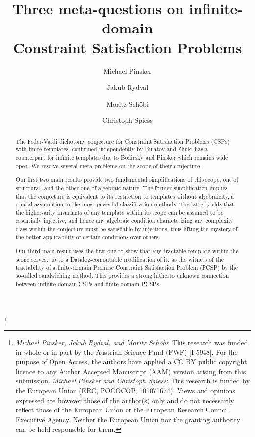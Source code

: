 \documentclass[oneside,reqno,10pt]{amsart}
\theoremstyle{plain}
\theoremstyle{remark}
\begin{document}
\title[Three meta-questions on infinite-domain Constraint Satisfaction Problems]{Three meta-questions on infinite-domain \\ Constraint Satisfaction Problems}
 
 
 
\author{Michael Pinsker}
\author{Jakub Rydval}
\author{Moritz Sch\"{o}bi}
\author{Christoph Spiess}


\address{Institut f\"{u}r Diskrete Mathematik und Geometrie, FG Algebra, TU Wien, Austria}

 



 
 

 \begin{abstract}   
 The Feder-Vardi dichotomy conjecture for Constraint Satisfaction Problems (CSPs) with finite templates, confirmed independently by Bulatov and Zhuk, has a counterpart for infinite templates due to Bodirsky and Pinsker which remains wide open. We resolve several meta-problems on the scope of their conjecture.

Our first two main results provide 
%
two fundamental simplifications of this scope, 
one of  structural, and the other one of algebraic nature. The former simplification implies that the conjecture is equivalent to its restriction to templates without algebraicity, a crucial assumption in the most powerful classification methods. The latter yields that the higher-arity invariants of any template within its scope can be assumed to be essentially injective, and hence any algebraic condition characterizing any complexity class within the conjecture must be satisfiable by injections, thus lifting the mystery of the better applicability of certain conditions over others.

Our third main result uses the first one to show that any tractable template within the scope  serves, up to a Datalog-computable modification of it, as the witness of the tractability of a finite-domain Promise Constraint Satisfaction Problem (PCSP) by the so-called sandwiching method. This provides a strong hitherto unknown connection between infinite-domain CSPs and finite-domain PCSPs.
\end{abstract}  

\thanks{\emph{Michael Pinsker, Jakub Rydval, and Moritz Sch\"{o}bi}: This research was funded in whole or in part by the Austrian Science Fund (FWF) [I 5948]. For the purpose of Open Access, the authors have applied a CC BY public copyright licence to any Author Accepted Manuscript (AAM) version arising from this submission. \emph{Michael Pinsker and Christoph Spiess}: This research is  funded by the European Union (ERC, POCOCOP, 101071674). Views and opinions expressed are however those of the author(s) only and do not necessarily reflect those of the European Union or the European Research Council Executive Agency. Neither the European Union nor the granting authority can be held responsible for them.}

 

\maketitle
  
 
\end{document}
